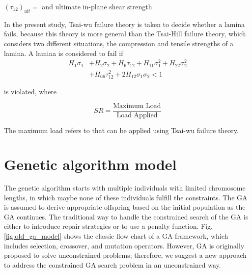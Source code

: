 \documentclass[10pt, journal]{IEEEtran}
\begin{document}
$(\tau_{12})_{ult}= $ and ultimate in-plane shear strength

In the present study, Tsai-wu failure theory is taken to decide whether a lamina fails,
because this theory is more general than the Tsai-Hill failure theory, which considers two
different situations, the compression and tensile strengths of a lamina. A lamina is considered to fail
if \begin{equation} \label{eq:tsai_wu}
\begin{split}
	H_1 \sigma_1  & + H_2 \sigma_2 + H_6 \tau_{12} + H_{11}\sigma_1^2 + H_{22} \sigma_2^2 \\
				  & + H_{66}  \tau_{12}^2 + 2H_{12}\sigma_1\sigma_2 < 1
\end{split}
\end{equation}

is violated, where

\begin{equation} \label{eq:sr}S R=\frac{\text {Maximum Load}}{\text {Load Applied}}
\end{equation}

The maximum load refers to that can be applied using Tsai-wu failure theory.


\section{Genetic algorithm model}
The genetic algorithm starts with multiple individuals with limited chromosome lengths, in
which maybe none of these individuals fulfill the constraints. The GA is
assumed to derive appropriate offspring based on the initial population as the
GA continues. The traditional way to handle the constrained search of the GA is
either to introduce repair strategies or to use a penalty function. Fig.
\ref{fig:old_ga_model} shows the classic flow chart of a GA framework, which
includes selection, crossover, and mutation operators. However, GA is originally
proposed to solve unconstrained problems; therefore, we suggest a new approach 
to address the constrained GA search problem in an unconstrained way. 
\end{document}
